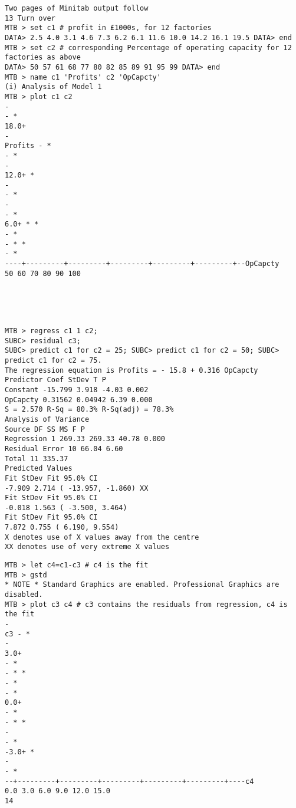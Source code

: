 \documentclass[a4paper,12pt]{article}
\begin{document}
\newpage
\begin{framed}
\begin{verbatim}
Two pages of Minitab output follow
13 Turn over
MTB > set c1 # profit in £1000s, for 12 factories
DATA> 2.5 4.0 3.1 4.6 7.3 6.2 6.1 11.6 10.0 14.2 16.1 19.5 DATA> end
MTB > set c2 # corresponding Percentage of operating capacity for 12 factories as above
DATA> 50 57 61 68 77 80 82 85 89 91 95 99 DATA> end
MTB > name c1 'Profits' c2 'OpCapcty'
(i) Analysis of Model 1
MTB > plot c1 c2
-
- *
18.0+
-
Profits - *
- *
-
12.0+ *
-
- *
-
- *
6.0+ * *
- *
- * *
- *
----+---------+---------+---------+---------+---------+--OpCapcty
50 60 70 80 90 100


\end{verbatim}
\end{framed}
\newpage
\begin{framed}
\begin{verbatim}
    


MTB > regress c1 1 c2;
SUBC> residual c3;
SUBC> predict c1 for c2 = 25; SUBC> predict c1 for c2 = 50; SUBC> predict c1 for c2 = 75.
The regression equation is Profits = - 15.8 + 0.316 OpCapcty
Predictor Coef StDev T P
Constant -15.799 3.918 -4.03 0.002
OpCapcty 0.31562 0.04942 6.39 0.000
S = 2.570 R-Sq = 80.3% R-Sq(adj) = 78.3%
Analysis of Variance
Source DF SS MS F P
Regression 1 269.33 269.33 40.78 0.000
Residual Error 10 66.04 6.60
Total 11 335.37
Predicted Values
Fit StDev Fit 95.0% CI
-7.909 2.714 ( -13.957, -1.860) XX
Fit StDev Fit 95.0% CI
-0.018 1.563 ( -3.500, 3.464)
Fit StDev Fit 95.0% CI
7.872 0.755 ( 6.190, 9.554)
X denotes use of X values away from the centre
XX denotes use of very extreme X values
\end{verbatim}
\end{framed}
\newpage
\begin{framed}
\begin{verbatim}
MTB > let c4=c1-c3 # c4 is the fit
MTB > gstd
* NOTE * Standard Graphics are enabled. Professional Graphics are disabled.
MTB > plot c3 c4 # c3 contains the residuals from regression, c4 is the fit
-
c3 - *
-
3.0+
- *
- * *
- *
- *
0.0+
- *
- * *
-
- *
-3.0+ *
-
- *
--+---------+---------+---------+---------+---------+----c4
0.0 3.0 6.0 9.0 12.0 15.0
14
\end{verbatim}
\end{framed}
\newpage
\end{document}
